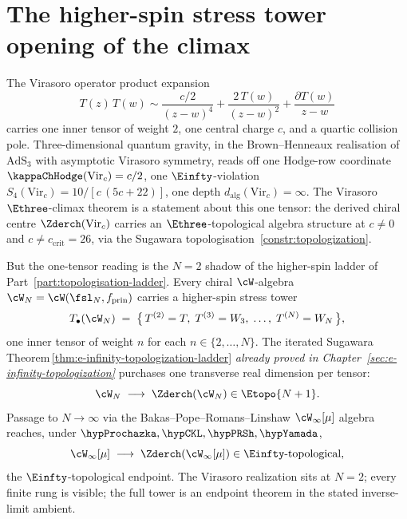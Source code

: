 
\chapter{The higher-spin stress tower opening of the climax}
\label{ch:part-vi-higher-spin-stress-tower-opening}
\label{ch:part-vi-platonic-introduction}%

The Virasoro operator product expansion
\begin{equation}
 T(z)\,T(w) \sim \frac{c/2}{(z-w)^4} + \frac{2\,T(w)}{(z-w)^2}
 + \frac{\partial T(w)}{z-w}
\end{equation}
carries one inner tensor of weight $2$, one central charge $c$, and a
quartic collision pole. Three-dimensional quantum gravity, in the
Brown--Henneaux realisation of $\mathrm{AdS}_3$ with asymptotic
Virasoro symmetry, reads off one Hodge-row coordinate
$\kappaChHodge(\mathrm{Vir}_c) = c/2$, one $\Einfty$-violation
$S_4(\mathrm{Vir}_c) = 10/[c\,(5c+22)]$, one depth
$d_{\mathrm{alg}}(\mathrm{Vir}_c) = \infty$. The Virasoro
$\Ethree$-climax theorem is a statement about this one tensor: the
derived chiral centre $\Zderch(\mathrm{Vir}_c)$ carries an
$\Ethree$-topological algebra structure at $c \ne 0$ and
$c \ne c_{\mathrm{crit}} = 26$, via the Sugawara
topologisation~\ref{constr:topologization}.

But the one-tensor reading is the $N = 2$ shadow of the higher-spin
ladder of Part~\ref{part:topologisation-ladder}. Every chiral $\cW$-algebra
$\cW_N = \cW(\fsl_N, f_{\mathrm{prin}})$ carries a higher-spin stress
tower
\begin{equation}
 T_\bullet(\cW_N) \;=\; \bigl\{\,T^{(2)} = T,\; T^{(3)} = W_3,\;
 \ldots,\; T^{(N)} = W_N \,\bigr\},
 \label{eq:part-vi-wn-tower}
\end{equation}
one inner tensor of weight $n$ for each $n \in \{2, \ldots, N\}$. The
iterated Sugawara
Theorem\,\ref{thm:e-infinity-topologization-ladder}
\emph{already proved in
Chapter~\ref{sec:e-infinity-topologization}} purchases one transverse
real dimension per tensor:
\begin{equation}
 \cW_N \;\longrightarrow\; \Zderch(\cW_N) \in \Etopo{N+1}.
 \label{eq:part-vi-wn-ladder}
\end{equation}
Passage to $N \to \infty$ via the Bakas--Pope--Romans--Linshaw
$\cW_\infty[\mu]$ algebra reaches, under
\(\hypProchazka,\hypCKL,\hypPRSh,\hypYamada\),
\begin{equation}
 \cW_\infty[\mu] \;\longrightarrow\; \Zderch(\cW_\infty[\mu]) \in \Einfty\text{-topological},
 \label{eq:part-vi-winfty-ladder}
\end{equation}
the $\Einfty$-topological endpoint. The Virasoro realization sits at $N=2$;
every finite rung is visible; the full tower is an endpoint theorem in
the stated inverse-limit ambient.

